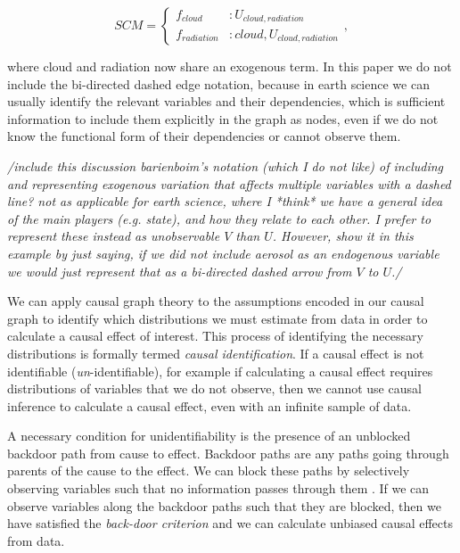 \documentclass[12pt]{article}
\begin{document}
\begin{equation}
  SCM =
  \begin{cases}
    f_{cloud} &: U_{cloud,radiation}  \\
    f_{radiation} &: cloud, U_{cloud,radiation}
  \end{cases},
  \label{eq:2}
\end{equation}

where cloud and radiation now share an exogenous term. In this paper
we do not include the bi-directed dashed edge notation, because in
earth science we can usually identify the relevant variables and their
dependencies, which is sufficient information to include them
explicitly in the graph as nodes, even if we do not know the
functional form of their dependencies or cannot observe them.

\textit{/include this discussion barienboim's notation (which I do not
  like) of including and representing exogenous variation that
  affects multiple variables with a dashed line? not as applicable for
  earth science, where I *think* we have a general idea of the main
  players (e.g. state), and how they relate to each other. I prefer to
  represent these instead as unobservable $V$ than $U$. However, show
  it in this example by just saying, if we did not include aerosol as
  an endogenous variable we would just represent that as a bi-directed
  dashed arrow from $V$ to $U$./}

We can apply causal graph theory
\citep[e.g.,][]{pearl1995causal,shpitser2006} to the assumptions
encoded in our causal graph to identify which distributions we must
estimate from data in order to calculate a causal effect of
interest. This process of identifying the necessary distributions is
formally termed \emph{causal identification}. If a causal effect is
not identifiable (\emph{un}-identifiable), for example if calculating
a causal effect requires distributions of variables that we do not
observe, then we cannot use causal inference to calculate a causal
effect, even with an infinite sample of data.


A necessary condition for unidentifiability is the presence of an
unblocked backdoor path from cause to effect. Backdoor paths are any
paths going through parents of the cause to the effect. We can block
these paths by selectively observing variables such that no
information passes through them \citep{geiger-d-sep}. If we can
observe variables along the backdoor paths such that they are blocked,
then we have satisfied the \emph{back-door criterion}
\citep{pearl2009} and we can calculate unbiased causal effects from
data.
\end{document}
